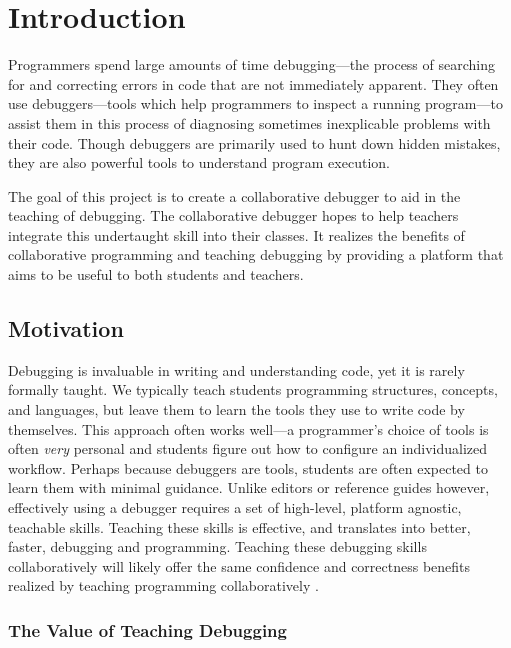 \documentclass[12pt]{article}
\begin{document}
\tableofcontents
\pagebreak

\section{Introduction}

Programmers spend large amounts of time debugging---the process of
searching for and correcting errors in code that are not immediately
apparent.  They often use debuggers---tools which help programmers to
inspect a running program---to assist them in this process of
diagnosing sometimes inexplicable problems with their code.  Though
debuggers are primarily used to hunt down hidden mistakes, they are
also powerful tools to understand program execution.
\par

The goal of this project is to create a collaborative debugger to aid
in the teaching of debugging.  The collaborative debugger hopes to
help teachers integrate this undertaught skill into their classes.  It
realizes the benefits of collaborative programming and teaching
debugging by providing a platform that aims to be useful to both
students and teachers.

\subsection{Motivation}

Debugging is invaluable in writing and understanding code, yet it is
rarely formally taught\cite{doi:10.1080/08993400802114581}.  We
typically teach students programming structures, concepts, and
languages, but leave them to learn the tools they use to write code by
themselves.  This approach often works well---a programmer's choice of
tools is often \textit{very} personal and students figure out how to
configure an individualized workflow.  Perhaps because debuggers are
tools, students are often expected to learn them with minimal
guidance.  Unlike editors or reference guides however, effectively
using a debugger requires a set of high-level, platform agnostic,
teachable skills.  Teaching these skills is effective, and translates
into better, faster, debugging and
programming\cite{10.1145/3286960.3286970}\cite{10.1145/3361721.3361724}.
Teaching these debugging skills collaboratively will likely offer the
same confidence and correctness benefits realized by teaching
programming collaboratively
\cite{10.1145/1026487.1008043}\cite{10.1145/1145287.1145293}.

\subsubsection{The Value of Teaching Debugging}
\end{document}
